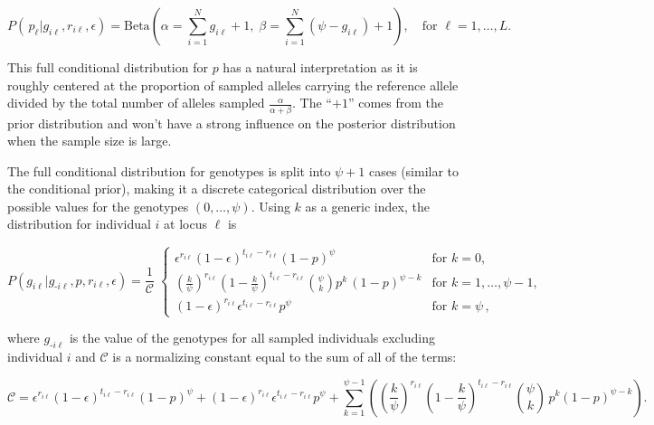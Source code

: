 \documentclass[11pt,english,letterpaper,oneside]{article}
\begin{document}
\begin{equation}\label{p-full}
{P}(\,p_{\ell}|g_{i \ell},r_{i \ell},\epsilon) = \text{Beta}\left(\alpha= \sum_{i=1}^N g_{i \ell} +1,\; \beta = \sum_{i=1}^N (\psi-g_{i \ell})+1\right),\quad \text{for } \ell = 1,\ldots,L.
\end{equation}

\noindent This full conditional distribution for $p$ has a natural interpretation as it is roughly centered at the proportion of sampled alleles carrying the reference allele divided by the total number of alleles sampled $\frac{\alpha}{\alpha+\beta}$. The ``$+1$'' comes from the prior distribution and won't have a strong influence on the posterior distribution when the sample size is large.

The full conditional distribution for genotypes is split into $\psi+1$ cases (similar to the conditional prior), making it a discrete categorical distribution over the possible values for the genotypes $(0,\ldots,\psi)$. Using $k$ as a generic index, the distribution for individual $i$ at locus $\ell$ is

\begin{equation}\label{G-full}
{P}(g_{i \ell}|g_{\text{-}i \ell},p,r_{i \ell},\epsilon) = \frac{1}{\mathcal{C}} \;
	\begin{cases}
	\epsilon^{r_{i \ell}}(1-\epsilon)^{t_{i \ell}-r_{i \ell}}(1-p)^\psi & \text{for  } k = 0, \\[0.05in]
	\left(\frac{k}{\psi}\right)^{r_{i \ell}}\left(1-\frac{k}{\psi}\right)^{t_{i \ell}-r_{i \ell}}\displaystyle\binom{\psi}{k}p^{k}\,(1-p)^{\psi-k} & \text{for  } k = 1,\ldots,\psi-1, \\[0.05in]
	(1-\epsilon)^{r_{i \ell}}\epsilon^{t_{i \ell}-r_{i \ell}}p^\psi & \text{for  } k = \psi\,,
	\end{cases} 
\end{equation}

\noindent where $g_{\text{-}i \ell}$ is the value of the genotypes for all sampled individuals excluding individual $i$ and $\mathcal{C}$ is a normalizing constant equal to the sum of all of the terms:

\begin{equation*}
\mathcal{C} = \epsilon^{r_{i \ell}}(1-\epsilon)^{t_{i \ell}-r_{i \ell}}(1-p)^\psi + (1-\epsilon)^{r_{i \ell}}\epsilon^{t_{i \ell}-r_{i \ell}}p^\psi + \sum_{k=1}^{\psi-1}\left(\left(\frac{k}{\psi}\right)^{r_{i \ell}}\left(1-\frac{k}{\psi}\right)^{t_{i \ell}-r_{i \ell}}\binom{\psi}{k}\,p^k(1-p)^{\psi-k}\right).
\end{equation*}
\end{document}
